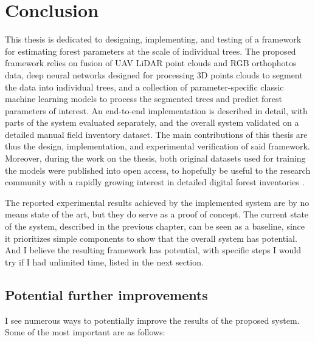 \chapter{Conclusion}\label{cap:conclusion}


This thesis is dedicated to designing, implementing, and testing of a framework for estimating forest parameters at the scale of individual trees.
The proposed framework relies on fusion of UAV LiDAR point clouds and RGB orthophotos data, deep neural networks designed for processing 3D points clouds to segment the data into individual trees, and a collection of parameter-specific classic machine learning models to process the segmented trees and predict forest parameters of interest.
An end-to-end implementation is described in detail, with parts of the system evaluated separately, and the overall system validated on a detailed manual field inventory dataset.
The main contributions of this thesis are thus the design, implementation, and experimental verification of said framework.
Moreover, during the work on the thesis, both original datasets used for training the models were published into open access, to hopefully be useful to the research community with a rapidly growing interest in detailed digital forest inventories \citep{dubrovinExplorationPropertiesPoint2024, dubrovinOpenDatasetIndividual2024}.

The reported experimental results achieved by the implemented system are by no means state of the art, but they do serve as a proof of concept.
The current state of the system, described in the previous chapter, can be seen as a baseline, since it prioritizes simple components to show that the overall system has potential.
And I believe the resulting framework has potential, with specific steps I would try if I had unlimited time, listed in the next section.

\section{Potential further improvements}

I see numerous ways to potentially improve the results of the proposed system.
Some of the most important are as follows:

